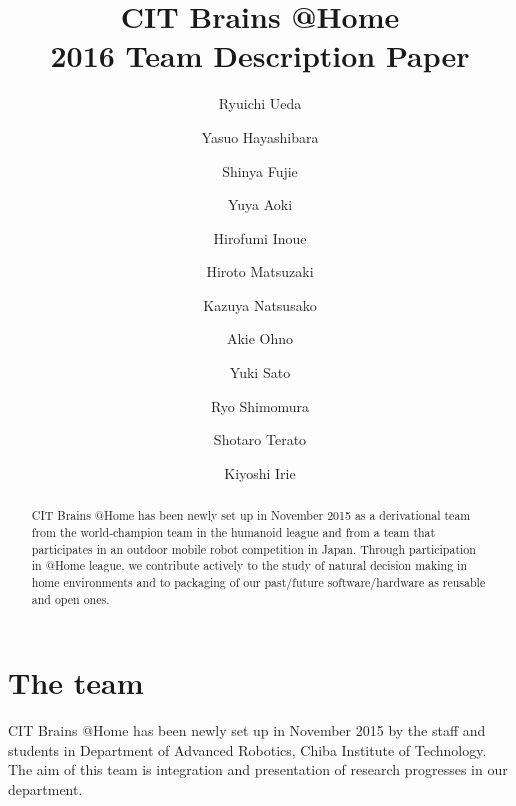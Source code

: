 \documentclass{llncs}
\begin{document}
\title{CIT Brains @Home\\2016 Team Description Paper}

\author{Ryuichi Ueda \and
Yasuo Hayashibara \and
Shinya Fujie \and
Yuya Aoki \and
Hirofumi Inoue \and
Hiroto Matsuzaki \and
Kazuya Natsusako \and
Akie Ohno \and
Yuki Sato \and
Ryo Shimomura \and
Shotaro Terato \and
Kiyoshi Irie
}


\maketitle
%
\begin{abstract}
CIT Brains @Home has been newly set up in November 2015
as a derivational team from the world-champion team
in the humanoid league and from a team that participates in
an outdoor mobile robot competition in Japan.
Through participation in @Home league,
we contribute actively to the study of natural decision making
in home environments and to packaging of our past/future
software/hardware as reusable and open ones.
\end{abstract}

\section{The team}

CIT Brains @Home has been newly set up in November 2015
by the staff and students in Department of Advanced Robotics,
Chiba Institute of Technology.
The aim of this team is integration and presentation
of research progresses in our department.
\end{document}
